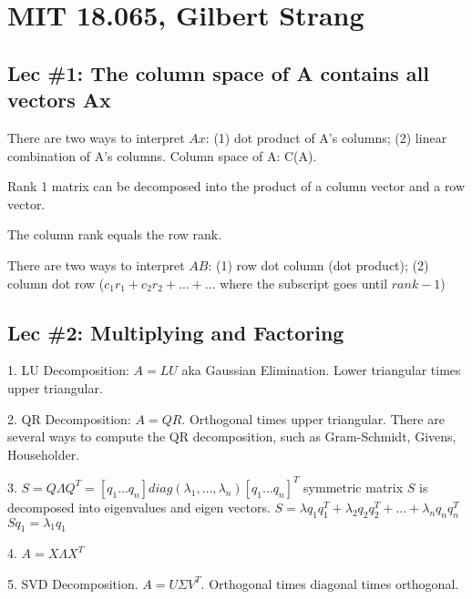 \section{MIT 18.065, Gilbert Strang}

\subsection{Lec \#1: The column space of A contains all vectors Ax}

There are two ways to interpret $Ax$: (1) dot product of A's columns;
(2) linear combination of A's columns.  Column space of A: C(A).

Rank 1 matrix can be decomposed into the product of a column vector
and a row vector.

The column rank equals the row rank.

There are two ways to interpret $AB$: (1) row dot column (dot product);
(2) column dot row ($c_1r_1+c_2r_2+\ldots+...$ where the subscript goes
until $rank-1$)

\subsection{Lec \#2: Multiplying and Factoring}

1. LU Decomposition: $A=LU$ aka Gaussian Elimination. Lower triangular times
upper triangular.

2. QR Decomposition: $A=QR$. Orthogonal times upper triangular. There are several
ways to compute the QR decomposition, such as Gram-Schmidt, Givens, Householder.

3. $S=Q\Lambda Q^T = [q_1 \ldots q_n]diag(\lambda_1,\ldots,\lambda_n)[q_1 \ldots q_n]^T$
symmetric matrix $S$ is decomposed into eigenvalues and eigen vectors.
$S=\lambda q_1q_1^T + \lambda_2 q_2q_2^T + \ldots + \lambda_n q_n q_n^T$
$Sq_1 = \lambda_1 q_1$

4. $A=X\Lambda X^T$

5. SVD Decomposition. $A=U\Sigma V^T$. Orthogonal times diagonal times orthogonal.
